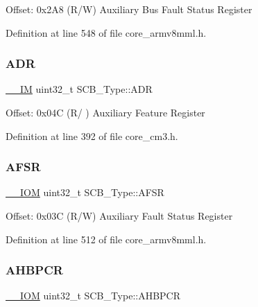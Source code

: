 Offset\+: 0x2\+A8 (R/W) Auxiliary Bus Fault Status Register 

Definition at line 548 of file core\+\_\+armv8mml.\+h.

\mbox{\label{struct_s_c_b___type_af084e1b2dad004a88668efea1dfe7fa1}} 
\subsubsection{\texorpdfstring{A\+DR}{ADR}}
{\footnotesize\ttfamily \hyperlink{core__sc300_8h_a4cc1649793116d7c2d8afce7a4ffce43}{\+\_\+\+\_\+\+IM} uint32\+\_\+t S\+C\+B\+\_\+\+Type\+::\+A\+DR}

Offset\+: 0x04C (R/ ) Auxiliary Feature Register 

Definition at line 392 of file core\+\_\+cm3.\+h.

\mbox{\label{struct_s_c_b___type_ab65372404ce64b0f0b35e2709429404e}} 
\subsubsection{\texorpdfstring{A\+F\+SR}{AFSR}}
{\footnotesize\ttfamily \hyperlink{core__sc300_8h_ab6caba5853a60a17e8e04499b52bf691}{\+\_\+\+\_\+\+I\+OM} uint32\+\_\+t S\+C\+B\+\_\+\+Type\+::\+A\+F\+SR}

Offset\+: 0x03C (R/W) Auxiliary Fault Status Register 

Definition at line 512 of file core\+\_\+armv8mml.\+h.

\mbox{\label{struct_s_c_b___type_a0d53bcea294422b5b4ecfdcd9cdc1773}} 
\subsubsection{\texorpdfstring{A\+H\+B\+P\+CR}{AHBPCR}}
{\footnotesize\ttfamily \hyperlink{core__sc300_8h_ab6caba5853a60a17e8e04499b52bf691}{\+\_\+\+\_\+\+I\+OM} uint32\+\_\+t S\+C\+B\+\_\+\+Type\+::\+A\+H\+B\+P\+CR}

